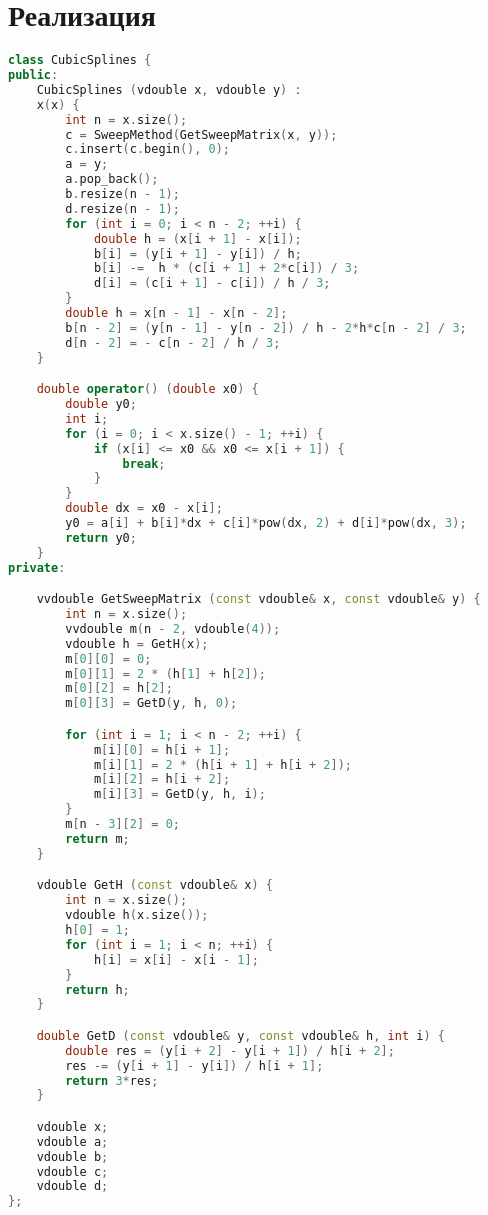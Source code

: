 \section*{Реализация}

\begin{lstlisting}[language=C++]
class CubicSplines {
public:
    CubicSplines (vdouble x, vdouble y) :
    x(x) {
        int n = x.size();
        c = SweepMethod(GetSweepMatrix(x, y));
        c.insert(c.begin(), 0);
        a = y;
        a.pop_back();
        b.resize(n - 1);
        d.resize(n - 1);
        for (int i = 0; i < n - 2; ++i) {
            double h = (x[i + 1] - x[i]);
            b[i] = (y[i + 1] - y[i]) / h;
            b[i] -=  h * (c[i + 1] + 2*c[i]) / 3;
            d[i] = (c[i + 1] - c[i]) / h / 3;
        }
        double h = x[n - 1] - x[n - 2];
        b[n - 2] = (y[n - 1] - y[n - 2]) / h - 2*h*c[n - 2] / 3;
        d[n - 2] = - c[n - 2] / h / 3;
    }

    double operator() (double x0) {
        double y0;
        int i;
        for (i = 0; i < x.size() - 1; ++i) {
            if (x[i] <= x0 && x0 <= x[i + 1]) {
                break;
            }
        }
        double dx = x0 - x[i];
        y0 = a[i] + b[i]*dx + c[i]*pow(dx, 2) + d[i]*pow(dx, 3);
        return y0;
    }
private:

    vvdouble GetSweepMatrix (const vdouble& x, const vdouble& y) {
        int n = x.size();
        vvdouble m(n - 2, vdouble(4));
        vdouble h = GetH(x);
        m[0][0] = 0;
        m[0][1] = 2 * (h[1] + h[2]);
        m[0][2] = h[2];
        m[0][3] = GetD(y, h, 0);

        for (int i = 1; i < n - 2; ++i) {
            m[i][0] = h[i + 1];
            m[i][1] = 2 * (h[i + 1] + h[i + 2]);
            m[i][2] = h[i + 2];
            m[i][3] = GetD(y, h, i);
        }
        m[n - 3][2] = 0;
        return m;
    }

    vdouble GetH (const vdouble& x) {
        int n = x.size();
        vdouble h(x.size());
        h[0] = 1;
        for (int i = 1; i < n; ++i) {
            h[i] = x[i] - x[i - 1];
        }
        return h;
    }

    double GetD (const vdouble& y, const vdouble& h, int i) {
        double res = (y[i + 2] - y[i + 1]) / h[i + 2];
        res -= (y[i + 1] - y[i]) / h[i + 1];
        return 3*res;
    }

    vdouble x;
    vdouble a;
    vdouble b;
    vdouble c;
    vdouble d;
};
\end{lstlisting}

\pagebreak